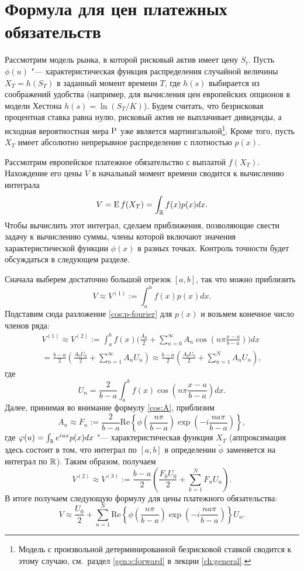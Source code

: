 \section{Формула для цен платежных обязательств}

Рассмотрим модель рынка, в которой рисковый актив имеет цену $S_t$. 
Пусть $\phi(u)$ "--- характеристическая функция распределения случайной величины $X_T = h(S_T)$ в заданный момент времени $T$, где $h(s)$ выбирается из соображений удобства (например, для вычисления цен европейских опционов в модели Хестона $h(s) = \ln(S_T/K)$).
Будем считать, что безрисковая процентная ставка равна нулю, рисковый актив не выплачивает дивиденды, а исходная вероятностная мера $\P$ уже является мартингальной\footnote{Модель с произвольной детерминированной безрисковой ставкой сводится к этому случаю, см.~раздел \ref{gen:s:forward} в лекции \ref{ch:general}.}.
Кроме того, пусть $X_T$ имеет абсолютно непрерывное распределение с плотностью $p(x)$. 

Рассмотрим европейское платежное обязательство с выплатой $f(X_T)$.
Нахождение его цены $V$ в начальный момент времени сводится к вычислению интеграла
\[
V = \E f(X_T) = \int_\R f(x) p(x) dx.
\]
Чтобы вычислить этот интеграл, сделаем приближения, позволяющие свести задачу к вычислению суммы, члены которой включают значения характеристической функции $\phi(x)$ в разных точках.
Контроль точности будет обсуждаться в следующем разделе.

Сначала выберем достаточно большой отрезок $[a,b]$, так что можно приблизить
\begin{equation}
\label{cos:V1}
V \approx V^{(1)} := \int_{a}^{b} f(x) p(x) dx.
\end{equation}
Подставим сюда разложение \eqref{cos:p-fourier} для $p(x)$ и возьмем конечное число членов ряда:
\begin{multline}
\label{cos:V2}
V^{(1)} \approx V^{(2)} := \int_a^b f(x) \biggl( \frac{A_0}{2} + \sum_{n=0}^\infty A_n \cos\left(n\pi\frac{x-a}{b-a}\right) \biggr) dx \\
= \frac{b-a}{2} \left( \frac{A_0U_0}{2} + \sum_{n=1}^\infty A_nU_n  \right)
\approx \frac{b-a}{2} \left( \frac{A_0U_0}{2} + \sum_{n=1}^{N} A_nU_n \right),
\end{multline}
где
\[
U_n = \frac{2}{b-a}\int_a^b f(x) \cos\left(n\pi\frac{x-a}{b-a}\right) dx.
\]
Далее, принимая во внимание формулу \eqref{cos:A}, приблизим 
\begin{equation}
\label{cos:F}
A_n \approx F_n := \frac{2}{b-a} \mathrm{Re}\left\{ \phi\left(\frac{n\pi}{b-a}\right)\exp\left(-i\frac{na\pi}{b-a}\right) \right\},
\end{equation}
где $\phi(u)=\int_\R e^{iux}p(x)dx$ "--- характеристическая функция $X_T$ (аппроксимация здесь состоит в том, что интеграл по $[a,b]$ в определении $\tilde\phi$ заменяется на интеграл по $\R$).
Таким образом, получаем 
\[
V^{(2)} \approx V^{(3)} := \frac{b-a}{2} \left(\frac{F_0U_0}{2} + \sum_{k=1}^N F_nU_n\right).
\]
В итоге получаем следующую формулу для цены платежного обязательства:
\[
V\approx 
\frac{U_0}{2} 
  + \sum_{n=1}^N \mathrm{Re}\left\{ 
    \phi\left(\frac{n\pi}{b-a}\right)\exp\left(-i\frac{na\pi}{b-a}\right) 
  \right\} U_n.
\]

